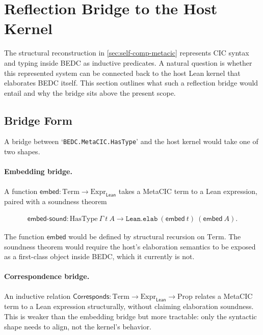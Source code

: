 \section{Reflection Bridge to the Host Kernel}\label{sec:self-comp-reflection-bridge}

The structural reconstruction in \autoref{sec:self-comp-metacic} represents CIC
syntax and typing inside BEDC as inductive predicates. A natural question is
whether this represented system can be connected back to the host Lean kernel
that elaborates BEDC itself. This section outlines what such a reflection
bridge would entail and why the bridge sits above the present scope.

\subsection{Bridge Form}\label{subsec:bridge-form}

A bridge between `\verb|BEDC.MetaCIC.HasType|' and the host kernel would take
one of two shapes.

\paragraph{Embedding bridge.} A function $\mathsf{embed} : \mathrm{Term}
\to \mathrm{Expr}_{\mathsf{Lean}}$ takes a MetaCIC term to a Lean expression,
paired with a soundness theorem

$$
\begin{aligned}
\mathsf{embed\text{-}sound} :
  \mathrm{HasType}\ \Gamma\ t\ A \rightarrow
  \texttt{Lean.elab}\ (\mathsf{embed}\ t)\ (\mathsf{embed}\ A).
\end{aligned}
$$

The function $\mathsf{embed}$ would be defined by structural recursion on
$\mathrm{Term}$. The soundness theorem would require the host's elaboration
semantics to be exposed as a first-class object inside BEDC, which it currently
is not.

\paragraph{Correspondence bridge.} An inductive relation
$\mathsf{Corresponds} : \mathrm{Term} \to \mathrm{Expr}_{\mathsf{Lean}}
\to \mathrm{Prop}$ relates a MetaCIC term to a Lean expression structurally,
without claiming elaboration soundness. This is weaker than the embedding
bridge but more tractable: only the syntactic shape needs to align, not the
kernel's behavior.

